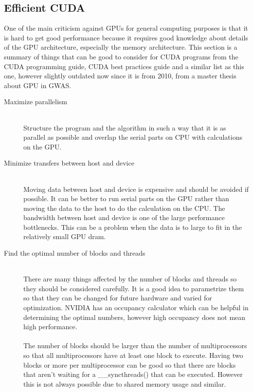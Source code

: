 \documentclass[10pt,a4paper]{report}
\begin{document}
\subsection{Efficient CUDA}
One of the main criticism against GPUs for general computing purposes is that it is hard to get good performance because it requires good knowledge about details of the GPU architecture, especially the memory architecture. This section is a summary of things that can be good to consider for CUDA programs from the CUDA programming guide\cite{cuda}, CUDA best practices guide \cite{cuda_best_practice} and a similar list as this one, however slightly outdated now since it is from 2010, from a master thesis about GPU in GWAS\cite{plink_gpu}.
\\
\begin{description}
  \item[Maximize parallelism] \hfill \\
  Structure the program and the algorithm in such a way that it is as parallel as possible and overlap the serial parts on CPU with calculations on the GPU.\cite{plink_gpu, cuda}
  \item[Minimize transfers between host and device] \hfill \\
  Moving data between host and device is expensive and should be avoided if possible. It can be better to run serial parts on the GPU rather than moving the data to the host to do the calculation on the CPU. The bandwidth between host and device is one of the large performance bottlenecks. This can be a problem when the data is to large to fit in the relatively small GPU dram.\cite{cuda, cuda_best_practice}
  \item[Find the optimal number of blocks and threads] \hfill \\
  There are many things affected by the number of blocks and threads so they should be considered carefully. It is a good idea to parametrize them so that they can be changed for future hardware and varied for optimization. NVIDIA has an occupancy calculator which can be helpful in determining the optimal numbers, however high occupancy does not mean high performance.\cite{cuda, cuda_best_practice}\\
  \\
  The number of blocks should be larger than the number of multiprocessors so that all multiprocessors have at least one block to execute. Having two blocks or more per multiprocessor can be good so that there are blocks that aren't waiting for a \_\_syncthreads() that can be executed. However this is not always possible due to shared memory usage and similar.\cite{cuda_best_practice}\\

\end{description}
\end{document}
